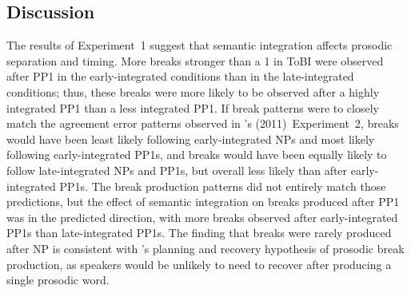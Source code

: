 \documentclass[12pt,titlepage]{article}
\newcommand{\IGNORE}[1]{} %
\begin{document}
\subsection{Discussion}

The results of Experiment~1 suggest that semantic integration affects prosodic separation and timing. More breaks stronger than a 1 in ToBI were observed after PP1 in the early-integrated conditions than in the late-integrated conditions; thus, these breaks were more likely to be observed after a highly integrated PP1 than a less integrated PP1. If break patterns were to closely match the agreement error patterns observed in \citeauthor{GillespiePearlmutter11}'s (2011)~Experiment~2, breaks would have been least likely following early-integrated NPs and most likely following early-integrated PP1s, and breaks would have been equally likely to follow late-integrated NPs and PP1s, but overall less likely than after early-integrated PP1s. The break production patterns did not entirely match those predictions, but the effect of semantic integration on breaks produced after PP1 was in the predicted direction, with more breaks observed after early-integrated PP1s than late-integrated PP1s. The finding that breaks were rarely produced after NP is consistent with 's planning and recovery hypothesis of prosodic break production, as speakers would be unlikely to need to recover after producing a single prosodic word.

\IGNORE{ So, as predicted, speakers were more likely to \IGNORE{produce evidence of a break after PP1 in the early-integrated condition, thus }prosodically separate the less-integrated, linearly distant PP2 from the head noun (N1) it modified. \citeA{WatsonEtAl06} suggested that speakers are more likely to separate less semantically related material because they are more likely to be planned separately (also see \citeNP{BreenEtAl10}). Thus the findings from the ToBI labeling are consistent with Watson et al.'s planning and recovery hypothesis. In addition, the ToBI findings are consistent with \citeauthor{GillespiePearlmutter11}'s \citeyear{GillespiePearlmutter11} explanation for why agreement error rates were the lowest for this condition; only local nouns that are planned overlappingly with the head noun are likely to interfere with agreement computation.}
\end{document}
